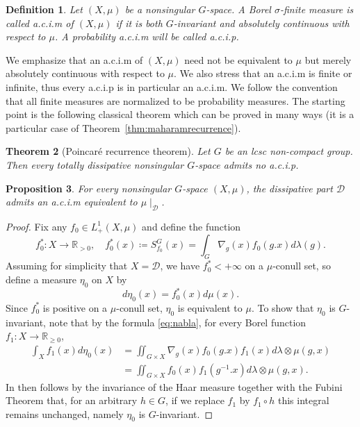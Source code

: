 \documentclass{amsart}
\numberwithin{equation}{subsection}
\newtheorem{thm}{Theorem}[section]
\newtheorem{prop}[thm]{Proposition}
\newtheorem{defn}[thm]{Definition}
\begin{document}
\begin{defn}
Let \(\left(X,\mu\right)\) be a nonsingular \(G\)-space. A Borel \(\sigma\)-finite measure is called {\sc a.c.i.m} of \(\left(X,\mu\right)\) if it is both \(G\)-invariant and absolutely continuous with respect to \(\mu\). A probability {\sc a.c.i.m} will be called  {\sc a.c.i.p}.
\end{defn}

We emphasize that an {\sc a.c.i.m} of \(\left(X,\mu\right)\) need not be equivalent to \(\mu\) but merely absolutely continuous with respect to \(\mu\). We also stress that an {\sc a.c.i.m} is finite or infinite, thus every {\sc a.c.i.p} is in particular an {\sc a.c.i.m}. We follow the convention that all finite measures are normalized to be probability measures. The starting point is the following classical theorem which can be proved in many ways (it is a particular case of Theorem~\ref{thm:maharamrecurrence}).

\begin{thm}[Poincar\'{e} recurrence theorem]
\label{thm:poincareacip}
Let \(G\) be an lcsc non-compact group. Then every totally dissipative nonsingular \(G\)-space admits no {\sc a.c.i.p}.
\end{thm}

\begin{prop}
\label{prop:dissacim}
For every nonsingular \(G\)-space \(\left(X,\mu\right)\), the dissipative part \(\mathcal{D}\) admits an {\sc a.c.i.m} equivalent to \(\mu\mid_{\mathcal{D}}\).
\end{prop}

\begin{proof}
Fix any \(f_{0}\in L_{+}^{1}\left(X,\mu\right)\) and define the function
\[f_{0}^{\ast}:X\to\mathbb{R}_{>0},\quad f_{0}^{\ast}\left(x\right)\coloneqq S_{f_{0}}^{G}\left(x\right)=\int_{G}\nabla_{g}\left(x\right)f_{0}\left(g.x\right)d\lambda\left(g\right).\]
Assuming for simplicity that \(X=\mathcal{D}\), we have \(f_{0}^{\ast}<+\infty\) on a \(\mu\)-conull set, so define a measure \(\eta_{0}\) on \(X\) by
\[d\eta_{0}\left(x\right)=f_{0}^{\ast}\left(x\right)d\mu\left(x\right).\]
Since \(f_{0}^{\ast}\) is positive on a \(\mu\)-conull set, \(\eta_{0}\) is equivalent to \(\mu\). To show that \(\eta_{0}\) is \(G\)-invariant, note that by the formula \eqref{eq:nabla}, for every Borel function \(f_{1}:X\to\mathbb{R}_{\geq 0}\),
\begin{align*}
\int_{X}f_{1}\left(x\right)d\eta_{0}\left(x\right)
&=\iint\nolimits_{G\times X}\nabla_{g}\left(x\right)f_{0}\left(g.x\right)f_{1}\left(x\right)d\lambda\otimes\mu\left(g,x\right)\\
&=\iint\nolimits_{G\times X}f_{0}\left(x\right)f_{1}\left(g^{-1}.x\right)d\lambda\otimes\mu\left(g,x\right).
\end{align*}
In then follows by the invariance of the Haar measure together with the Fubini Theorem that, for an arbitrary \(h\in G\), if we replace \(f_{1}\) by \(f_{1}\circ h\) this integral remains unchanged, namely \(\eta_{0}\) is \(G\)-invariant.
\end{proof}
\end{document}
